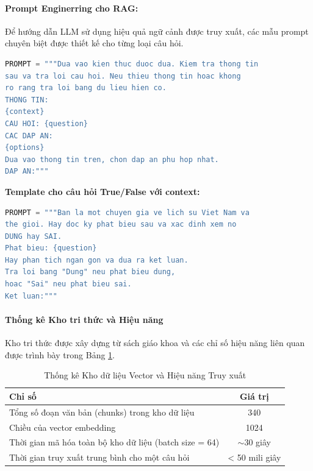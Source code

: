 \paragraph{Prompt Enginerring cho RAG:} Để hướng dẫn LLM sử dụng hiệu quả ngữ cảnh được truy xuất, các mẫu prompt chuyên biệt được thiết kế cho từng loại câu hỏi.

\begin{lstlisting}[language=Python, caption={Prompt template cho câu hỏi trắc nghiệm với RAG}]
PROMPT = """Dua vao kien thuc duoc dua. Kiem tra thong tin 
sau va tra loi cau hoi. Neu thieu thong tin hoac khong 
ro rang tra loi bang du lieu hien co.
THONG TIN:
{context}
CAU HOI: {question}
CAC DAP AN:
{options}
Dua vao thong tin tren, chon dap an phu hop nhat.
DAP AN:"""
\end{lstlisting}
\textbf{Template cho câu hỏi True/False với context:}
\begin{lstlisting}[language=Python, caption={Prompt template cho câu hỏi đúng/sai với RAG}]
PROMPT = """Ban la mot chuyen gia ve lich su Viet Nam va 
the gioi. Hay doc ky phat bieu sau va xac dinh xem no 
DUNG hay SAI.
Phat bieu: {question}
Hay phan tich ngan gon va dua ra ket luan. 
Tra loi bang "Dung" neu phat bieu dung, 
hoac "Sai" neu phat bieu sai.
Ket luan:"""
\end{lstlisting}
\paragraph{Thống kê Kho tri thức và Hiệu năng}
Kho tri thức được xây dựng từ sách giáo khoa và các chỉ số hiệu năng liên quan được trình bày trong Bảng \ref{tab:vector-store-stats}.

\begin{table}[H]
\centering
\caption{Thống kê Kho dữ liệu Vector và Hiệu năng Truy xuất}
\label{tab:vector-store-stats}
\begin{tabular}{|>{\raggedright}p{7cm}|c|}
\hline
\textbf{Chỉ số} & \textbf{Giá trị} \\ \hline
Tổng số đoạn văn bản (chunks) trong kho dữ liệu & 340 \\ \hline
Chiều của vector embedding & 1024 \\ \hline
Thời gian mã hóa toàn bộ kho dữ liệu (batch size = 64) & $\sim$30 giây \\ \hline
Thời gian truy xuất trung bình cho một câu hỏi & < 50 mili giây \\ \hline
\end{tabular}
\end{table}

